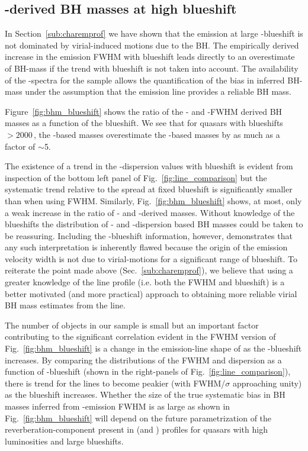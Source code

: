 \subsection{-derived BH masses at high  blueshift}
\label{sec:highzmasses}

In Section~\ref{sub:charemprof} we have shown that the  emission at large -blueshift is not dominated by virial-induced motions due to the BH. 
The empirically derived increase in the  emission FWHM with blueshift leads directly to an overestimate of BH-mass if the trend with blueshift is not taken into account. 
The availability of the \hans-spectra for the sample allows the quantification of the bias in inferred BH-mass under the assumption that the \ha emission line provides a reliable BH mass. 

Figure~\ref{fig:bhm_blueshift} shows the ratio of the - and \hans-FWHM derived BH masses as a function of the  blueshift.  
We see that for quasars with  blueshifts $>2000$\,\kms, the -based masses overestimate the \hans-based masses by as much as a factor of $\sim$5. 

The existence of a trend in the -dispersion values with  blueshift is evident from inspection of the bottom left panel of Fig.~\ref{fig:line_comparison} but the systematic trend relative to the spread at fixed blueshift is significantly smaller than when using  FWHM. 
Similarly, Fig.~\ref{fig:bhm_blueshift} shows, at most, only a weak increase in the ratio of - and \hans-derived masses. 
Without knowledge of the  blueshifts the distribution of - and \hans-dispersion based BH masses could be taken to be reassuring. 
Including the -blueshift information, however, demonstrates that any such interpretation is inherently flawed because the origin of the  emission velocity width is not due to virial-motions for a significant range of  blueshift. 
To reiterate the point made above (Sec.~\ref{sub:charemprof}), we believe that using a greater knowledge of the line profile (i.e. both the FWHM and blueshift) is a better motivated (and more practical) approach to obtaining more reliable virial BH mass estimates from the  line. 

The number of objects in our sample is small but an important factor contributing to the significant correlation evident in the FWHM version of Fig.~\ref{fig:bhm_blueshift} is a change in the emission-line shape of \ha as the -blueshift increases.
By comparing the distributions of the \ha FWHM and dispersion as a function of -blueshift (shown in the right-panels of Fig.~\ref{fig:line_comparison}), there is trend for the \ha lines to become peakier (with FWHM/$\sigma$ approaching unity) as the  blueshift increases. 
Whether the size of the true systematic bias in BH masses inferred from -emission FWHM is as large as shown in Fig.~\ref{fig:bhm_blueshift} will depend on the future parametrization of the reverberation-component present in \hb (and \hans) profiles for quasars with high luminosities and large  blueshifts.

